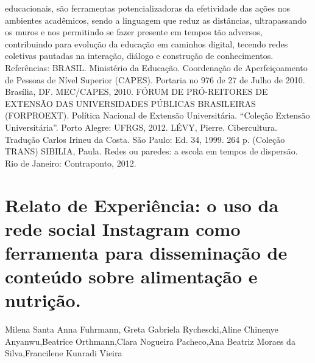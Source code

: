 educacionais, são ferramentas potencializadoras da efetividade das ações nos ambientes
acadêmicos, sendo a linguagem que reduz as distâncias, ultrapassando os muros e nos permitindo
se fazer presente em tempos tão adversos, contribuindo para evolução da educação em caminhos
digital, tecendo redes coletivas pautadas na interação, diálogo e construção de conhecimentos.
Referências:
BRASIL. Ministério da Educação. Coordenação de Aperfeiçoamento de Pessoas de Nível
Superior (CAPES). Portaria no 976 de 27 de Julho de 2010. Brasília, DF. MEC/CAPES,
2010.
FÓRUM DE PRÓ-REITORES DE EXTENSÃO DAS UNIVERSIDADES PÚBLICAS
BRASILEIRAS (FORPROEXT). Política Nacional de Extensão Universitária. “Coleção
Extensão Universitária”. Porto Alegre: UFRGS, 2012.
LÉVY, Pierre. Cibercultura. Tradução Carlos Irineu da Costa. São Paulo: Ed. 34, 1999. 264 p.
(Coleção TRANS)
SIBILIA, Paula. Redes ou paredes: a escola em tempos de dispersão. Rio de Janeiro:
Contraponto, 2012.



\section{Relato de Experiência: o uso da rede social Instagram como ferramenta para disseminação de conteúdo sobre alimentação e nutrição.}

Milena Santa Anna Fuhrmann, Greta Gabriela Rychescki,Aline Chinenye Anyanwu,Beatrice Orthmann,Clara Nogueira Pacheco,Ana Beatriz Moraes da Silva,Francilene Kunradi Vieira

